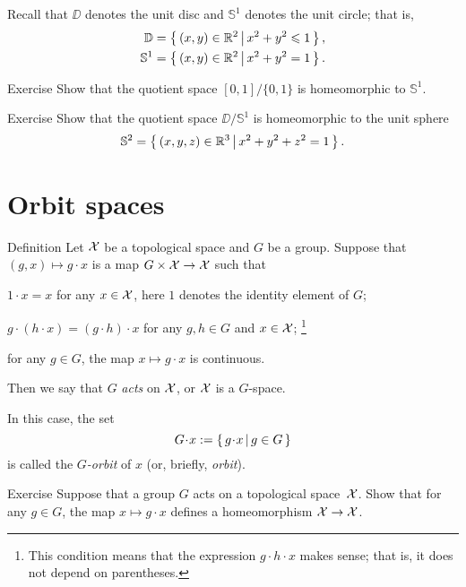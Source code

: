 Recall that $\DD$ denotes the unit disc and $\mathbb{S}^1$ denotes the unit circle;
that is,
\begin{align*}
\mathbb{D}&=\left\{\,{(x,y)\in\mathbb{R}^2}\,\middle|\,{x^2+y^2\leqslant 1}\,\right\},
\\
\mathbb{S}^1&=\left\{\,{(x,y)\in\mathbb{R}^2}\,\middle|\,{x^2+y^2=1}\,\right\}.
\end{align*}

\begin{thm}{Exercise}\label{ex:[0,1]/0=1}
Show that the quotient space $[0,1]/\{0,1\}$ is homeomorphic to $\mathbb{S}^1$.
\end{thm}

\begin{thm}{Exercise}\label{ex:D/S}
Show that the quotient space $\DD/\mathbb{S}^1$ is homeomorphic to the unit sphere 
\[\mathbb{S}^2=\left\{\,{(x,y,z)\in\mathbb{R}^3}\,\middle|\,{x^2+y^2+z^2=1}\,\right\}.\]
\end{thm}


\section{Orbit spaces}

\begin{thm}{Definition}
Let $\mathcal{X}$ be a topological space and $G$ be a group.
Suppose that $(g,x)\mapsto g\cdot x$ is a map $G\times\mathcal{X}\to \mathcal{X}$ such that
\begin{subthm}{}
$1\cdot x=x$ for any $x\in \mathcal{X}$, here $1$ denotes the identity element of $G$;
\end{subthm}
\begin{subthm}{}
$g\cdot (h\cdot x)=(g\cdot h)\cdot x$ for any $g,h\in G$ and $x\in \mathcal{X}$;%
\footnote{This condition means that the expression $g\cdot h\cdot x$ makes sense; that is, it does not depend on parentheses.}
\end{subthm}
\begin{subthm}{}
for any $g\in G$, the map $x\mapsto g\cdot x$ is continuous.
\end{subthm}
Then we say that $G$ \emph{acts} on $\mathcal{X}$, or $\mathcal{X}$ is a $G$-space.

In this case, the set
\[G\cdot x:=\set{g\cdot x}{g\in G}\]
is called the \emph{$G$-orbit} of $x$ (or, briefly, \emph{orbit}).
\end{thm}

\begin{thm}{Exercise}\label{ex:g-homeo}
Suppose that a group $G$ acts on a topological space~$\mathcal{X}$.
Show that for any $g\in G$, the map $x\mapsto g\cdot x$ defines a homeomorphism $\mathcal{X}\to \mathcal{X}$.
\end{thm}

